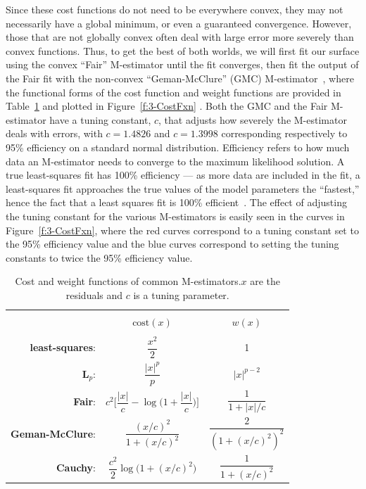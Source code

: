 Since these cost functions do not need to be everywhere convex, they may not necessarily have a global minimum, or even a guaranteed convergence.
However, those that are not globally convex often deal with large error more severely than convex functions.
Thus, to get the best of both worlds, we will first fit our surface using the convex ``Fair'' M-estimator until the fit converges, then fit the output of the Fair fit with the non-convex ``Geman-McClure'' (GMC) M-estimator~\cite{RN52}, where the functional forms of the cost function and weight functions are provided in Table~\ref{t:3-CostFxn} and plotted in Figure~\ref{f:3-CostFxn} .
Both the GMC and the Fair M-estimator have a tuning constant, $c$, that adjusts how severely the M-estimator deals with errors, with $c = 1.4826$ and $c = 1.3998$ corresponding respectively to 95\% efficiency on a standard normal distribution.
Efficiency refers to how much data an M-estimator needs to converge to the maximum likelihood solution.
A true least-squares fit has 100\% efficiency --- as more data are included in the fit, a least-squares fit approaches the true values of the model parameters the ``fastest,'' hence the fact that a least squares fit is 100\% efficient~\cite{RN269}.
The effect of adjusting the tuning constant for the various M-estimators is easily seen in the curves in Figure~\ref{f:3-CostFxn}, where the red curves correspond to a tuning constant set to the 95\% efficiency value and the blue curves correspond to setting the tuning constants to twice the 95\% efficiency value.
\newpage
\begin{table}[ht]
  \centering
  \caption{Cost and weight functions of common M-estimators.\@ $x$ are the residuals and $c$ is a tuning parameter.}
  \begin{tabular}{|r c c |}
    \hline \\[-0.45cm]
     & $\textrm{cost}(x)$ & $w(x)$\\
    \hline \\[-0.3cm]
    {\bf least-squares}:& $\dfrac{x^2}{2}$ & 1\\ [0.5cm]
    {\bf L$_p$}:& $ \dfrac{|x|^p}{p} $ & $|x|^{p-2}$\\[0.5cm]
    {\bf Fair}:& $c^2 \Bigg [ \dfrac{|x|}{c} - \log \Big ( 1 + \dfrac{|x|}{c}\Big ) \Bigg ]$ & $\dfrac{1}{1 + |x|/c}$ \\ [0.5cm]
    {\bf Geman-McClure}:& $\dfrac{(x/c)^2}{1+(x/c)^2}$ & $\dfrac{2}{(1+(x/c)^2)^2}$ \\ [0.5cm]
    {\bf Cauchy}:& $\dfrac{c^2}{2} \log \big ( 1 + (x/c)^2 \big)$ & $\dfrac{1}{1 + (x/c)^2}$\\ [0.5cm]
    \hline
  \end{tabular}\label{t:3-CostFxn}
\end{table}

